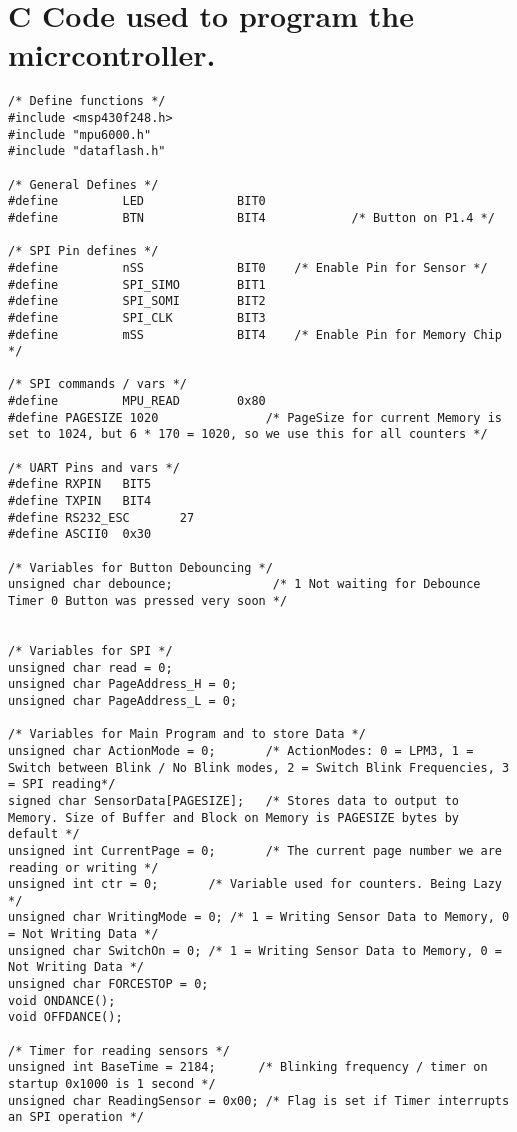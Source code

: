 \chapter{C Code used to program the micrcontroller.}
\label{Chap:CCODE}
\begin{lstlisting}[caption=main.h,label=Code1]
/* Define functions */
#include <msp430f248.h>
#include "mpu6000.h"
#include "dataflash.h"

/* General Defines */
#define         LED             BIT0
#define         BTN             BIT4            /* Button on P1.4 */

/* SPI Pin defines */
#define         nSS             BIT0    /* Enable Pin for Sensor */
#define         SPI_SIMO        BIT1
#define         SPI_SOMI        BIT2
#define         SPI_CLK         BIT3
#define         mSS             BIT4    /* Enable Pin for Memory Chip */

/* SPI commands / vars */
#define         MPU_READ        0x80
#define PAGESIZE 1020 				/* PageSize for current Memory is set to 1024, but 6 * 170 = 1020, so we use this for all counters */

/* UART Pins and vars */
#define RXPIN   BIT5
#define TXPIN   BIT4
#define RS232_ESC       27
#define ASCII0  0x30

/* Variables for Button Debouncing */
unsigned char debounce;              /* 1 Not waiting for Debounce Timer 0 Button was pressed very soon */


/* Variables for SPI */
unsigned char read = 0;
unsigned char PageAddress_H = 0;
unsigned char PageAddress_L = 0;

/* Variables for Main Program and to store Data */
unsigned char ActionMode = 0;       /* ActionModes: 0 = LPM3, 1 = Switch between Blink / No Blink modes, 2 = Switch Blink Frequencies, 3 = SPI reading*/
signed char SensorData[PAGESIZE]; 	/* Stores data to output to Memory. Size of Buffer and Block on Memory is PAGESIZE bytes by default */
unsigned int CurrentPage = 0;		/* The current page number we are reading or writing */
unsigned int ctr = 0;		/* Variable used for counters. Being Lazy */
unsigned char WritingMode = 0; /* 1 = Writing Sensor Data to Memory, 0 = Not Writing Data */
unsigned char SwitchOn = 0; /* 1 = Writing Sensor Data to Memory, 0 = Not Writing Data */
unsigned char FORCESTOP = 0; 
void ONDANCE();
void OFFDANCE();

/* Timer for reading sensors */
unsigned int BaseTime = 2184; 	   /* Blinking frequency / timer on startup 0x1000 is 1 second */
unsigned char ReadingSensor = 0x00; /* Flag is set if Timer interrupts an SPI operation */


\end{lstlisting}
